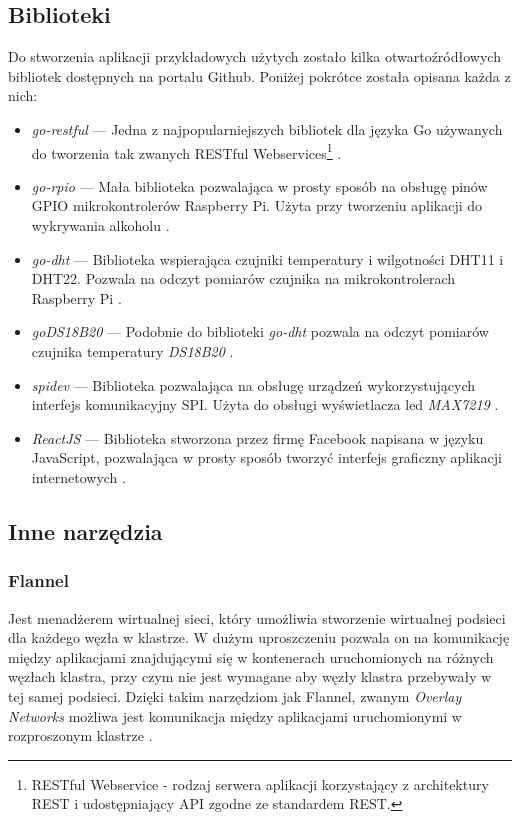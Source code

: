 \documentclass[12pt]{report}
\let\Oldsubsection\subsection
\renewcommand{\subsection}{\FloatBarrier\Oldsubsection}
\let\Oldsubsubsection\subsubsection
\renewcommand{\subsubsection}{\FloatBarrier\Oldsubsubsection}
\begin{document}
{\subsection{Biblioteki}
Do stworzenia aplikacji przykładowych użytych zostało kilka otwartoźródłowych bibliotek dostępnych na portalu Github. Poniżej pokrótce została opisana każda z nich:
\begin{itemize}
\item{\textit{go-restful} --- Jedna z najpopularniejszych bibliotek dla języka Go używanych do tworzenia tak zwanych RESTful Webservices\footnote{RESTful Webservice - rodzaj serwera aplikacji korzystający z architektury REST i udostępniający API zgodne ze standardem REST.} \cite{gorestful}.}
\item{\textit{go-rpio} --- Mała biblioteka pozwalająca w prosty sposób na obsługę pinów GPIO mikrokontrolerów Raspberry Pi. Użyta przy tworzeniu aplikacji do wykrywania alkoholu \cite{gorpio}.}
\item{\textit{go-dht} --- Biblioteka wspierająca czujniki temperatury i wilgotności DHT11 i DHT22. Pozwala na odczyt pomiarów czujnika na mikrokontrolerach Raspberry Pi \cite{godht}.}
\item{\textit{goDS18B20} --- Podobnie do biblioteki \textit{go-dht} pozwala na odczyt pomiarów czujnika temperatury \textit{DS18B20} \cite{gods18b20}.}
\item{\textit{spidev} --- Biblioteka pozwalająca na obsługę urządzeń wykorzystujących interfejs komunikacyjny SPI. Użyta do obsługi wyświetlacza led \textit{MAX7219} \cite{spidev}.}
\item{\textit{ReactJS} --- Biblioteka stworzona przez firmę Facebook napisana w języku JavaScript, pozwalająca w prosty sposób tworzyć interfejs graficzny aplikacji internetowych \cite{reactJSDoc}.}
\end{itemize}
\subsection{Inne narzędzia}
\subsubsection{Flannel}
Jest menadżerem wirtualnej sieci, który umożliwia stworzenie wirtualnej podsieci dla każdego węzła w klastrze. W dużym uproszczeniu pozwala on na komunikację między aplikacjami znajdującymi się w kontenerach uruchomionych na różnych węzłach klastra, przy czym nie jest wymagane aby węzły klastra przebywały w tej samej podsieci. Dzięki takim narzędziom jak Flannel, zwanym \textit{Overlay Networks} możliwa jest komunikacja między aplikacjami uruchomionymi w rozproszonym klastrze \cite{flannel}.
}
\end{document}
